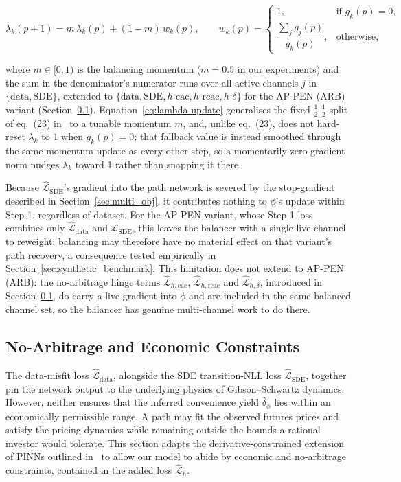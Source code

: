 \documentclass[11pt, a4paper]{article}
\begin{document}
\begin{equation}
\lambda_k(p+1) = m\,\lambda_k(p) + (1-m)\, w_k(p),
\qquad
w_k(p) =
\begin{cases}
1, & \text{if } g_k(p) = 0, \\[4pt]
\dfrac{\sum_{j} g_j(p)}{g_k(p)}, & \text{otherwise},
\end{cases}
\label{eq:lambda-update}
\end{equation}

where $m \in [0,1)$ is the balancing momentum ($m=0.5$ in our
experiments) and the sum in the denominator's numerator runs over all
active channels $j$ in $\{\text{data}, \text{SDE}\}$, extended to
$\{\text{data}, \text{SDE}, h\text{-cac}, h\text{-rcac}, h\text{-}\delta\}$
for the AP-PEN (ARB) variant (Section~\ref{sec:constraints}). Equation~\ref{eq:lambda-update}
generalises the fixed $\tfrac12$-$\tfrac12$ split of eq.\ (23)
in~\cite{Hoshisashi2024Physics-InformedPDEs} to a tunable momentum $m$, and,
unlike eq.\ (23), does not hard-reset $\lambda_k$ to $1$ when $g_k(p)=0$;
that fallback value is instead smoothed through the same momentum update as
every other step, so a momentarily zero gradient norm nudges $\lambda_k$
toward 1 rather than snapping it there.

Because $\hat{\mathcal{L}}_{\text{SDE}}$'s gradient into the path network is
severed by the stop-gradient described in Section~\ref{sec:multi_obj}, it
contributes nothing to $\phi$'s update within Step 1, regardless of dataset.
For the AP-PEN variant, whose Step 1 loss combines only
$\hat{\mathcal{L}}_{\text{data}}$ and $\hat{\mathcal{L}}_{\text{SDE}}$, this
leaves the balancer with a single live channel to reweight; balancing may
therefore have no material effect on that variant's path recovery, a
consequence tested empirically in Section~\ref{sec:synthetic_benchmark}. This
limitation does not extend to AP-PEN (ARB): the no-arbitrage hinge terms
$\hat{\mathcal{L}}_{h,\text{cac}}$, $\hat{\mathcal{L}}_{h,\text{rcac}}$ and
$\hat{\mathcal{L}}_{h,\delta}$, introduced in
Section~\ref{sec:constraints}, do carry a live gradient into $\phi$ and are
included in the same balanced channel set, so the balancer has genuine
multi-channel work to do there.



\subsection{No-Arbitrage and Economic Constraints}
\label{sec:constraints}
The data-misfit loss $\hat{\mathcal{L}}_{\text{data}}$, alongside the SDE transition-NLL loss $\hat{\mathcal{L}}_{\text{SDE}}$, together pin the network output to the underlying physics of Gibson–Schwartz dynamics. However, neither ensures that the inferred convenience yield $\hat{\delta}_{\phi}$ lies within an economically permissible range. A path may fit the observed futures prices and satisfy the pricing dynamics while remaining outside the bounds a rational investor would tolerate. This section adapts the derivative-constrained extension of PINNs outlined in~\cite{Hoshisashi2024Physics-InformedPDEs} to allow our model to abide by economic and no-arbitrage constraints, contained in the added loss $\hat{\mathcal{L}}_{h}$.
\end{document}
